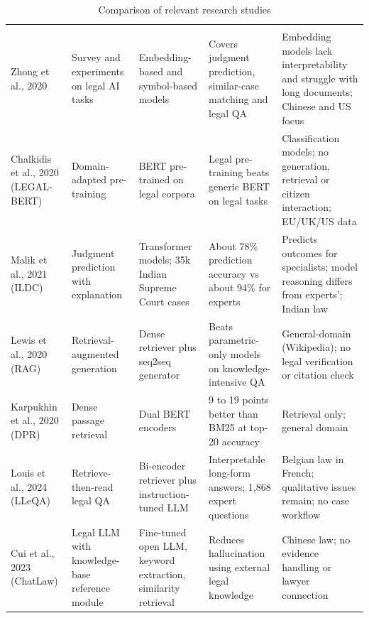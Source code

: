 \begin{longtable}{|L{1.76cm}|L{1.95cm}|L{2.54cm}|L{3.39cm}|L{3.91cm}|}
\caption{Comparison of relevant research studies}\label{tab:2.1}\\
\hline\headrow {} &  &  &  &  \\ \hline
\endfirsthead
\hline\headrow {} &  &  &  &  \\ \hline
\endhead
\hline\endlastfoot
Zhong et al., 2020 \cite{r1} & Survey and experiments on legal AI tasks & Embedding-based and symbol-based models & Covers judgment prediction, similar-case matching and legal QA & Embedding models lack interpretability and struggle with long documents; Chinese and US focus \\ \hline
Chalkidis et al., 2020 (LEGAL-BERT) \cite{r2} & Domain-adapted pre-training & BERT pre-trained on legal corpora & Legal pre-training beats generic BERT on legal tasks & Classification models; no generation, retrieval or citizen interaction; EU/UK/US data \\ \hline
Malik et al., 2021 (ILDC) \cite{r5} & Judgment prediction with explanation & Transformer models; 35k Indian Supreme Court cases & About 78\% prediction accuracy vs about 94\% for experts & Predicts outcomes for specialists; model reasoning differs from experts'; Indian law \\ \hline
Lewis et al., 2020 (RAG) \cite{r11} & Retrieval-augmented generation & Dense retriever plus seq2seq generator & Beats parametric-only models on knowledge-intensive QA & General-domain (Wikipedia); no legal verification or citation check \\ \hline
Karpukhin et al., 2020 (DPR) \cite{r12} & Dense passage retrieval & Dual BERT encoders & 9 to 19 points better than BM25 at top-20 accuracy & Retrieval only; general domain \\ \hline
Louis et al., 2024 (LLeQA) \cite{r16} & Retrieve-then-read legal QA & Bi-encoder retriever plus instruction-tuned LLM & Interpretable long-form answers; 1,868 expert questions & Belgian law in French; qualitative issues remain; no case workflow \\ \hline
Cui et al., 2023 (ChatLaw) \cite{r17} & Legal LLM with knowledge-base reference module & Fine-tuned open LLM, keyword extraction, similarity retrieval & Reduces hallucination using external legal knowledge & Chinese law; no evidence handling or lawyer connection \\ \hline

\end{longtable}
